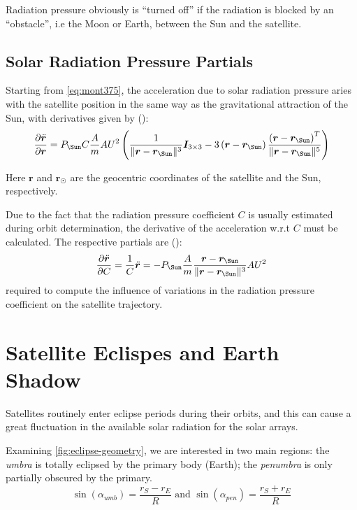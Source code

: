 Radiation pressure obviously is ``turned oﬀ'' if the radiation is blocked by an 
``obstacle'', i.e the Moon or Earth, between the Sun and the satellite. 

\subsection{Solar Radiation Pressure Partials}
\label{ssec:solar-radiation-pressure-partials}
Starting from \ref{eq:mont375}, the acceleration due to solar radiation pressure 
aries with the satellite position in the same way as the gravitational attraction
of the Sun, with derivatives given by (\cite{Montenbruck2000}):
\begin{equation}
  \label{eq:mont777}
  \frac{\partial \ddot{\bm{r}}}{\partial \bm{r}} = 
  P_{\Sun} C \frac{A}{m} {AU}^2 \left( 
    \frac{1}{\norm{\bm{r} - \bm{r}_{\Sun}}^3} \bm{I}_{3\times 3}
    -3 \left( \bm{r} - \bm{r}_{\Sun} \right) 
      \frac{\left( \bm{r} - \bm{r}_{\Sun} \right) ^T}{\norm{\bm{r} - \bm{r}_{\Sun}}^5}
      \right)
\end{equation}

Here $\bm{r}$ and $\bm{r}_{\Sun}$ are the geocentric coordinates of the 
satellite and the Sun, respectively.

Due to the fact that the radiation pressure coefficient $C$ is usually estimated 
during orbit determination, the derivative of the acceleration w.r.t $C$ must 
be calculated. The respective partials are (\cite{Montenbruck2000}):
\begin{equation}
  \label{eq:mont778}
  \frac{\partial \ddot{\bm{r}}}{\partial C} = \frac{1}{C} \ddot{\bm{r}} = 
  -P_{\Sun} \frac{A}{m} 
  \frac{\bm{r} - \bm{r}_{\Sun}}{\norm{\bm{r} - \bm{r}_{\Sun}}^3} {AU}^2
\end{equation}
required to compute the influence of variations in the radiation pressure
coefficient on the satellite trajectory.

\section{Satellite Eclispes and Earth Shadow}
Satellites routinely enter eclipse periods during their orbits, and
this can cause a great fluctuation in the available solar radiation for the solar 
arrays.

Examining \ref{fig:eclipse-geometry}, we are interested in two main regions: the 
\emph{umbra} is totally eclipsed by the primary body (Earth); the \emph{penumbra} 
is only partially obscured by the primary.
\begin{equation}
    \sin({\alpha}_{umb}) = \frac{r_S - r_E}{R} \text{ and }
    \sin({\alpha}_{pen}) = \frac{r_S + r_E}{R}
\end{equation}

